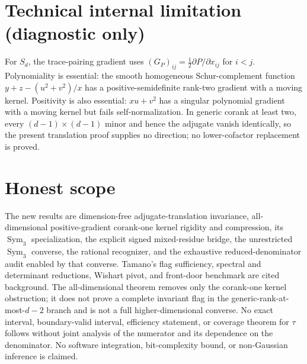 \documentclass{article}
\begin{document}
\section*{Technical internal limitation (diagnostic only)}

For \(S_d\), the trace-pairing gradient uses \((G_P)_{ij}=\tfrac12\partial P/\partial x_{ij}\) for \(i<j\). Polynomiality is essential: the smooth homogeneous Schur-complement function \(y+z-(u^2+v^2)/x\) has a positive-semidefinite rank-two gradient with a moving kernel. Positivity is also essential: \(xu+v^2\) has a singular polynomial gradient with a moving kernel but fails self-normalization. In generic corank at least two, every \((d-1)\times(d-1)\) minor and hence the adjugate vanish identically, so the present translation proof supplies no direction; no lower-cofactor replacement is proved.

\section{Honest scope}

The new results are dimension-free adjugate-translation invariance, all-dimensional positive-gradient corank-one kernel rigidity and compression, its \(\operatorname{Sym}_3\) specialization, the explicit signed mixed-residue bridge, the unrestricted \(\operatorname{Sym}_3\) converse, the rational recognizer, and the exhaustive reduced-denominator audit enabled by that converse. Tamano's flag sufficiency, spectral and determinant reductions, Wishart pivot, and front-door benchmark are cited background. The all-dimensional theorem removes only the corank-one kernel obstruction; it does not prove a complete invariant flag in the generic-rank-at-most-\(d-2\) branch and is not a full higher-dimensional converse. No exact interval, boundary-valid interval, efficiency statement, or coverage theorem for \(\tau\) follows without joint analysis of the numerator and its dependence on the denominator. No software integration, bit-complexity bound, or non-Gaussian inference is claimed.
\end{document}
